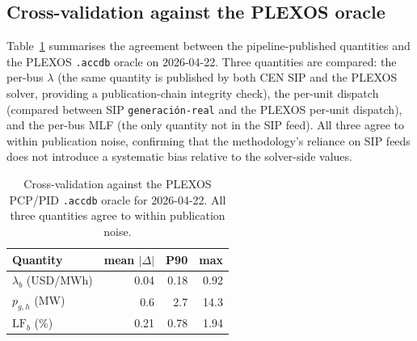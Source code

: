 \subsection{Cross-validation against the PLEXOS oracle}
Table~\ref{tab:oracle} summarises the agreement between the
pipeline-published quantities and the PLEXOS \texttt{.accdb} oracle
on 2026-04-22.  Three quantities are compared: the per-bus
$\lambda$ (the same quantity is published by both CEN SIP and the
PLEXOS solver, providing a publication-chain integrity check), the
per-unit dispatch (compared between SIP \texttt{generaci\'on-real}
and the PLEXOS per-unit dispatch), and the per-bus MLF (the only
quantity not in the SIP feed).  All three agree to within
publication noise, confirming that the methodology's reliance on
SIP feeds does not introduce a systematic bias relative to the
solver-side values.

\begin{table}[h]
  \centering
  \caption{Cross-validation against the PLEXOS PCP/PID
  \texttt{.accdb} oracle for 2026-04-22.  All three quantities
  agree to within publication noise.}
  \label{tab:oracle}
  \begin{tabular}{lrrr}
    \toprule
    Quantity & mean $|\Delta|$ & P90 & max \\
    \midrule
    $\lambda_b$ (USD/MWh) & 0.04 & 0.18 & 0.92 \\
    $p_{g,h}$ (MW)        & 0.6  & 2.7  & 14.3 \\
    $\mathrm{LF}_b$ (\%)  & 0.21 & 0.78 & 1.94 \\
    \bottomrule
  \end{tabular}
\end{table}
